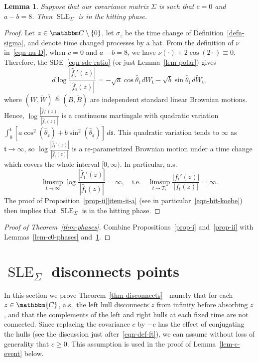 \documentclass[11pt]{article}
\theoremstyle{plain}
\newtheorem{lem}[thm]{Lemma}
\theoremstyle{definition}
\numberwithin{equation}{section}
\newcommand{\eqb}{\begin{equation}}
\newcommand{\eqe}{\end{equation}}
\newcommand{\BB}{\mathbbm}
\newcommand{\eqD}{\overset{d}{=}}
\newcommand{\rta}{\rightarrow}
\newcommand{\wt}{\widetilde}
\newcommand{\wh}{\widehat}
\newcommand{\SLEG}{{\operatorname{SLE}}_\Sigma}
\newcommand{\tz}{{\mathfrak t}}
\newcommand{\sz}{{\mathfrak s}}
\begin{document}
\begin{lem} \label{lem-c0-bdy}
Suppose that our covariance matrix $\Sigma$ is such that $c=0$ and $a-b=8$. 
Then $\SLEG$ is in the hitting phase.
\end{lem}
\begin{proof}
Let $z\in\BB C\setminus\{0\}$, let $\sigma_z$ be the time change of Definition~\ref{defn-sigma}, and denote time changed processes by a hat. 
From the definition of $\nu$ in~\eqref{eqn-nu-D}, when $c=0$ and $a-b=8$, we have $\nu(\cdot) + 2\cos(2\cdot) \equiv 0$. 
Therefore, the SDE~\eqref{eqn-sde-ratio} (or just Lemma~\ref{lem-polar}) gives
\eqb
d\log\frac{|\wh f_{\tz}' (z)|}{|\wh f_{\tz} (z)|} =  -  \sqrt{a}\cos{\wh\theta_\tz}\, dW_\tz - \sqrt{b}\sin{\wh\theta_\tz}\,  d\wt W_\tz , 
\eqe
where $(W,\wt W) \eqD (B,\wt B)$ are independent standard linear Brownian motions. Hence, $  \log\frac{|\wh f_{\tz}' (z)|}{|\wh f_{\tz} (z)|} $ is a continuous martingale with quadratic variation $\int_0^\tz [ a \cos^2(\wh\theta_\sz)  + b \sin^2(\wh\theta_\sz) ]\,d\sz$. This quadratic variation tends to $\infty$ as $\tz \rta\infty$, so $\log\frac{|\wh f_{\tz}' (z)|}{|\wh f_{\tz} (z)|}$ is a re-parametrized Brownian motion under a time change which covers the whole interval $[0,\infty)$. In particular, a.s.\ 
\eqb
\limsup_{\tz\rta\infty}\log\frac{|\wh f_{\tz}' (z)|}{|\wh f_{\tz} (z)|} =  \infty ,\quad \text{i.e.} \quad 
\limsup_{t\rta T_z^-} \frac{|f_t'(z)|}{|f_t(z)|} = \infty. 
\eqe
The proof of Proposition~{\hyperref[item-ii-b]{\ref*{prop-ii}\ref*{item-ii-a}}} (see in particular~\eqref{eqn-hit-koebe}) then implies that $\SLEG$ is in the hitting phase.  
\end{proof} 


\begin{proof}[Proof of Theorem~\ref{thm-phases}]
Combine Propositions~\ref{prop-i} and~\ref{prop-ii} with Lemmas~\ref{lem-c0-phases} and~\ref{lem-c0-bdy}. 
\end{proof}














\section{$\SLEG$ disconnects points}
\label{sec-disconnects}

In this section we prove Theorem~\ref{thm-disconnects}---namely that for each $z \in \BB{C}$, a.s.\ the left hull disconnects $z$ from infinity before absorbing $z$, and that the complements of the left and right hulls at each fixed time are not connected. 
Since replacing the covariance $c$ by $-c$ has the effect of conjugating the hulls (see the discussion just after~\eqref{eqn-def-ft}), we can assume without loss of generality that $c\geq 0$. This assumption is used in the proof of Lemma~\ref{lem-c-event} below.
\end{document}
